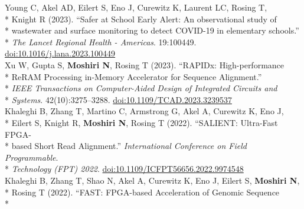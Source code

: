 \documentclass[margin,line]{res}
\begin{document}
\begin{resume}
\hspace*{9mm} Young C, Akel AD, Eilert S, Eno J, Curewitz K, Laurent LC, Rosing T,\\*
\hspace*{9mm} Knight R (2023). ``Safer at School Early Alert: An observational study of\\*
\hspace*{9mm} wastewater and surface monitoring to detect COVID-19 in elementary schools.''\\*\vspace{2mm}
\hspace*{8mm} \textit{The Lancet Regional Health - Americas}. 19:100449. \href{https://doi.org/10.1016/j.lana.2023.100449}{doi:10.1016/j.lana.2023.100449}\\
\hspace*{4mm} Xu W, Gupta S, \textbf{Moshiri N}, Rosing T (2023). ``RAPIDx: High-performance\\*
\hspace*{9mm} ReRAM Processing in-Memory Accelerator for Sequence Alignment.''\\*
\hspace*{9mm} \textit{IEEE Transactions on Computer-Aided Design of Integrated Circuits and}\\*\vspace{2mm}
\hspace*{8mm} \textit{Systems}. 42(10):3275--3288. \href{https://doi.org/10.1109/TCAD.2023.3239537}{doi:10.1109/TCAD.2023.3239537}\\
\hspace*{4mm} Khaleghi B, Zhang T, Martino C, Armstrong G, Akel A, Curewitz K, Eno J,\\*
\hspace*{9mm} Eilert S, Knight R, \textbf{Moshiri N}, Rosing T (2022). ``SALIENT: Ultra-Fast FPGA-\\*
\hspace*{9mm} based Short Read Alignment.'' \textit{International Conference on Field Programmable}.\\*\vspace{2mm}
\hspace*{7mm} \textit{Technology (FPT) 2022}. \href{https://doi.org/10.1109/ICFPT56656.2022.9974548}{doi:10.1109/ICFPT56656.2022.9974548}\\
\hspace*{4mm} Khaleghi B, Zhang T, Shao N, Akel A, Curewitz K, Eno J, Eilert S, \textbf{Moshiri N},\\*
\hspace*{9mm} Rosing T (2022). ``FAST: FPGA-based Acceleration of Genomic Sequence\\*

\end{resume}
\end{document}
